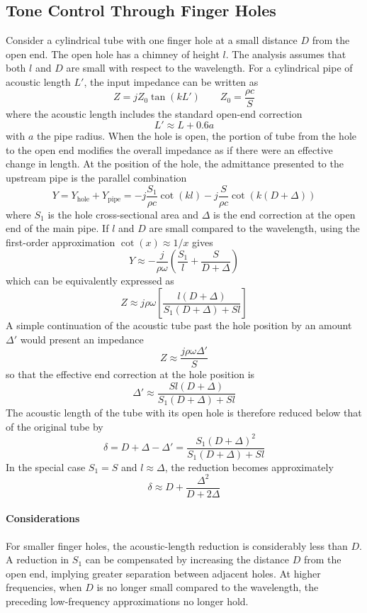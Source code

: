 \subsection{Tone Control Through Finger Holes}

Consider a cylindrical tube with one finger hole at a small distance \( D \) from the open end. The open hole has a chimney of height \( l \). The analysis assumes that both \( l \) and \( D \) are small with respect to the wavelength. For a cylindrical pipe of acoustic length \( L' \), the input impedance can be written as
\[
Z = jZ_0 \tan(kL')
\qquad
Z_0 = \frac{\rho c}{S}
\]
where the acoustic length includes the standard open-end correction
\[
L' \approx L + 0.6a
\]
with \( a \) the pipe radius. When the hole is open, the portion of tube from the hole to the open end modifies the overall impedance as if there were an effective change in length. At the position of the hole, the admittance presented to the upstream pipe is the parallel combination
\[
Y = Y_{\mathrm{hole}} + Y_{\mathrm{pipe}}
= -j\frac{S_1}{\rho c}\cot(kl) - j\frac{S}{\rho c}\cot\left(k(D+\Delta)\right)
\]
where \( S_1 \) is the hole cross-sectional area and \( \Delta \) is the end correction at the open end of the main pipe. If \( l \) and \( D \) are small compared to the wavelength, using the first-order approximation \( \cot(x) \approx 1/x \) gives
\[
Y \approx -\frac{j}{\rho\omega}
\left(
\frac{S_1}{l} + \frac{S}{D+\Delta}
\right)
\]
which can be equivalently expressed as
\[
Z \approx j\rho\omega
\left[
\frac{l(D+\Delta)}{S_1(D+\Delta) + Sl}
\right]
\]
A simple continuation of the acoustic tube past the hole position by an amount \( \Delta' \) would present an impedance
\[
Z \approx \frac{j\rho\omega \Delta'}{S}
\]
so that the effective end correction at the hole position is
\[
\Delta' \approx \frac{Sl(D+\Delta)}{S_1(D+\Delta) + Sl}
\]
The acoustic length of the tube with its open hole is therefore reduced below that of the original tube by
\[
\delta = D + \Delta - \Delta'
= \frac{S_1(D+\Delta)^2}{S_1(D+\Delta) + Sl}
\]
In the special case \( S_1 = S \) and \( l \approx \Delta \), the reduction becomes approximately
\[
\delta \approx D + \frac{\Delta^2}{D + 2\Delta}
\]

\paragraph{Considerations} For smaller finger holes, the acoustic-length reduction is considerably less than \( D \). A reduction in \( S_1 \) can be compensated by increasing the distance \( D \) from the open end, implying greater separation between adjacent holes. At higher frequencies, when \( D \) is no longer small compared to the wavelength, the preceding low-frequency approximations no longer hold.

